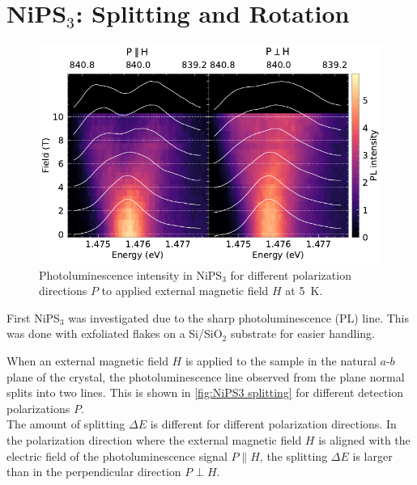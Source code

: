 \documentclass[
	oneside,
	parskip=half,
	a4paper,
]{scrbook}
\begin{document}
\section{NiPS$_3$: Splitting and Rotation}
\begin{figure}
	\centering
	\includegraphics{../figures/2024-04-10 NiPS4 splitting.pdf}
	\caption{
		Photoluminescence intensity in NiPS$_3$ for different polarization directions $P$ to applied external magnetic field $H$ at \SI{5}{K}.
	}
	\label{fig:NiPS3 splitting}
\end{figure}
First NiPS$_3$ was investigated due to the sharp photoluminescence (PL) line.
This was done with exfoliated flakes on a Si/SiO$_2$ substrate for easier handling.

When an external magnetic field $H$ is applied to the sample in the natural $a$-$b$ plane of the crystal, the photoluminescence line observed from the plane normal splits into two lines.
This is shown in \autoref{fig:NiPS3 splitting} for different detection polarizations $P$.\\
The amount of splitting $\Delta E$ is different for different polarization directions.
In the polarization direction where the external magnetic field $H$ is aligned with the electric field of the photoluminescence signal $P\parallel H$, the splitting $\Delta E$ is larger than in the perpendicular direction $P\perp H$.
\end{document}
